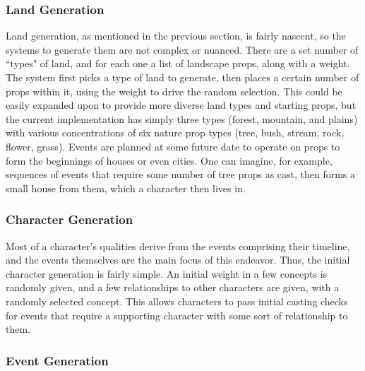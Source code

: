 \subsubsection{Land Generation}\label{subsubsec:delve-implementation-land-generation}

Land generation, as mentioned in the previous section, is fairly nascent, so the systems to generate them are not complex or nuanced. There are a set number of ``types" of land, and for each one a list of landscape props, along with a weight. The system first picks a type of land to generate, then places a certain number of props within it, using the weight to drive the random selection. This could be easily expanded upon to provide more diverse land types and starting props, but the current implementation has simply three types (forest, mountain, and plains) with various concentrations of six nature prop types (tree, bush, stream, rock, flower, grass). Events are planned at some future date to operate on props to form the beginnings of houses or even cities. One can imagine, for example, sequences of events that require some number of tree props as cast, then forms a small house from them, which a character then lives in.

\subsubsection{Character Generation}\label{subsubsec:delve-implementation-character-generation}

Most of a character's qualities derive from the events comprising their timeline, and the events themselves are the main focus of this endeavor. Thus, the initial character generation is fairly simple. An initial weight in a few concepts is randomly given, and a few relationships to other characters are given, with a randomly selected concept. This allows characters to pass initial casting checks for events that require a supporting character with some sort of relationship to them.

\subsubsection{Event Generation}\label{subsubsec:delve-implementation-event-generation}


